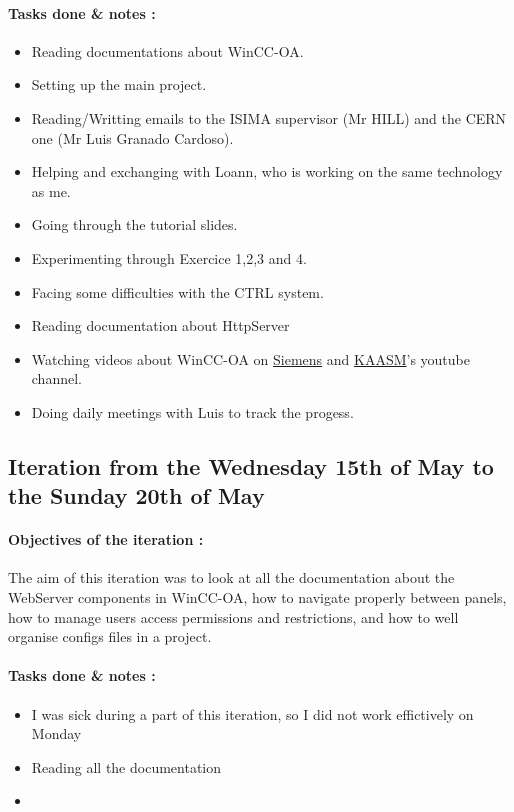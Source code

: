 \documentclass[a4paper, 10pt]{article}
\begin{document}
\paragraph{Tasks done \& notes :}
\begin{itemize}
    \item Reading documentations about WinCC-OA.
    \item Setting up the main project.
    \item Reading/Writting emails to the ISIMA supervisor (Mr HILL) and the CERN one (Mr Luis Granado Cardoso).
    \item Helping and exchanging with Loann, who is working on the same technology as me.
    \item Going through the tutorial slides.
    \item Experimenting through Exercice 1,2,3 and 4.
    \item Facing some difficulties with the CTRL system.
    \item Reading documentation about HttpServer
    \item Watching videos about WinCC-OA on \href{https://www.youtube.com/user/ETM2011}{Siemens} and  \href{https://www.youtube.com/channel/UCGBnHd1-B-Zg9MDsjTk0-Sw}{KAASM}'s youtube channel. 
    \item Doing daily meetings with Luis to track the progess.
\end{itemize}

\subsection{Iteration from the Wednesday 15th of May to the Sunday 20th of May}
\paragraph{Objectives of the iteration :}
The aim of this iteration was to look at all the documentation about the WebServer components in WinCC-OA, how to navigate properly between panels, how to manage users access permissions and restrictions, and how to well organise configs files in a project.
\paragraph{Tasks done \& notes :}
\begin{itemize}
    \item I was sick during a part of this iteration, so I did not work effictively on Monday
    \item Reading all the documentation
    \item 
\end{itemize}
\end{document}
